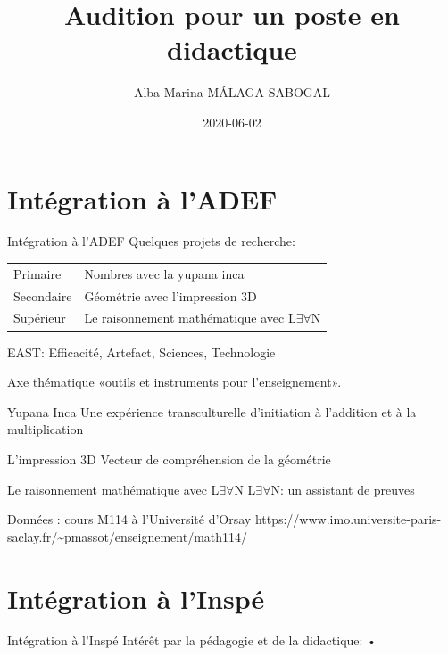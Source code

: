 \documentclass[
  french,
  ignorenonframetext,
]{beamer}
\title{Audition pour un poste en didactique}
\author{Alba Marina MÁLAGA SABOGAL}
\date{2020-06-02}
\begin{document}
\frame{\titlepage}

\hypertarget{intuxe9gration-uxe0-ladef}{%
\section{Intégration à l'ADEF}\label{intuxe9gration-uxe0-ladef}}

\begin{frame}{Intégration à l'ADEF}
Quelques projets de recherche:

\begin{longtable}[]{@{}ll@{}}
\toprule
\endhead
Primaire & Nombres avec la yupana inca\tabularnewline
Secondaire & Géométrie avec l'impression 3D\tabularnewline
Supérieur & Le raisonnement mathématique avec L\(∃∀\)N\tabularnewline
\bottomrule
\end{longtable}

EAST: Efficacité, Artefact, Sciences, Technologie

Axe thématique «outils et instruments pour l'enseignement».
\end{frame}

\begin{frame}{Yupana Inca}
\protect\hypertarget{yupana-inca}{}
Une expérience transculturelle d'initiation à l'addition et à la
multiplication
\end{frame}

\begin{frame}{L'impression 3D}
\protect\hypertarget{limpression-3d}{}
Vecteur de compréhension de la géométrie
\end{frame}

\begin{frame}{Le raisonnement mathématique avec L\(∃∀\)N}
\protect\hypertarget{le-raisonnement-mathuxe9matique-avec-ln}{}
L\(∃∀\)N: un assistant de preuves

Données : cours M114 à l'Université d'Orsay
https://www.imo.universite-paris-saclay.fr/\textasciitilde pmassot/enseignement/math114/
\end{frame}

\hypertarget{intuxe9gration-uxe0-linspuxe9}{%
\section{Intégration à l'Inspé}\label{intuxe9gration-uxe0-linspuxe9}}

\begin{frame}{Intégration à l'Inspé}
Intérêt par la pédagogie et de la didactique: •
\end{frame}
\end{document}
